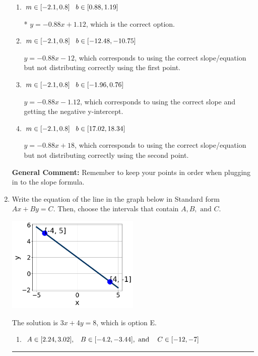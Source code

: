 \documentclass{extbook}[14pt]
\newcommand{\litem}[1]{\item #1

\rule{\textwidth}{0.4pt}}
\begin{document}
\begin{enumerate}
{\begin{enumerate}[label=\Alph*.]
 $y = 0.88x + 16.88$, which corresponds to using the negative slope and the correct equation.
\item \( m \in [-2.1, 0.8] \hspace*{3mm} b \in [0.88, 1.19] \)

* $y = -0.88x + 1.12$, which is the correct option.
\item \( m \in [-2.1, 0.8] \hspace*{3mm} b \in [-12.48, -10.75] \)

 $y = -0.88x -12$, which corresponds to using the correct slope/equation but not distributing correctly using the first point.
\item \( m \in [-2.1, 0.8] \hspace*{3mm} b \in [-1.96, 0.76] \)

 $y = -0.88x -1.12$, which corresponds to using the correct slope and getting the negative y-intercept.
\item \( m \in [-2.1, 0.8] \hspace*{3mm} b \in [17.02, 18.34] \)

 $y = -0.88x + 18$, which corresponds to using the correct slope/equation but not distributing correctly using the second point.
\end{enumerate}

\textbf{General Comment:} Remember to keep your points in order when plugging in to the slope formula.
}
\litem{
Write the equation of the line in the graph below in Standard form $Ax+By=C$. Then, choose the intervals that contain $A, B, \text{ and } C$.

\begin{center}
    \includegraphics[width=0.5\textwidth]{../Figures/linearGraphToStandardC.png}
\end{center}




The solution is \( 3x + 4y = 8 \), which is option E.\begin{enumerate}[label=\Alph*.]
\item \( A \in [2.24, 3.02], \hspace{3mm} B \in [-4.2, -3.44], \text{ and } \hspace{3mm} C \in [-12, -7] \)


\end{enumerate}}
\end{enumerate}
\end{document}
